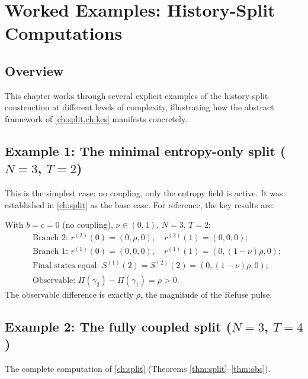 \documentclass[12pt, oneside]{memoir}
\begin{document}
\chapter{Worked Examples: History-Split Computations}
\label{ch:examples}

\section{Overview}

This chapter works through several explicit examples of the history-split construction
at different levels of complexity, illustrating how the abstract framework of
\cref{ch:split,ch:kes} manifests concretely.

\section{Example 1: The minimal entropy-only split ($N=3$, $T=2$)}

This is the simplest case: no coupling, only the entropy field is active.  It was
established in \cref{ch:split} as the base case.  For reference, the key results are:

\begin{example}
\label{ex:min}
With $b = c = 0$ (no coupling), $\nu \in (0,1)$, $N=3$, $T=2$:
\begin{align*}
  &\text{Branch 2: } r^{(2)}(0) = (0,\rho,0),\quad r^{(2)}(1) = (0,0,0); \\
  &\text{Branch 1: } r^{(1)}(0) = (0,0,0),\quad r^{(1)}(1) = (0,(1-\nu)\rho,0); \\
  &\text{Final states equal: } S^{(1)}(2) = S^{(2)}(2) = (0,(1-\nu)\rho,0); \\
  &\text{Observable: } \Pi(\gamma_2) - \Pi(\gamma_1) = \rho > 0.
\end{align*}
The observable difference is exactly $\rho$, the magnitude of the Refuse pulse.
\end{example}

\section{Example 2: The fully coupled split ($N=3$, $T=4$)}

The complete computation of \cref{ch:split} (Theorems \ref{thm:split}--\ref{thm:obs}).
\end{document}
